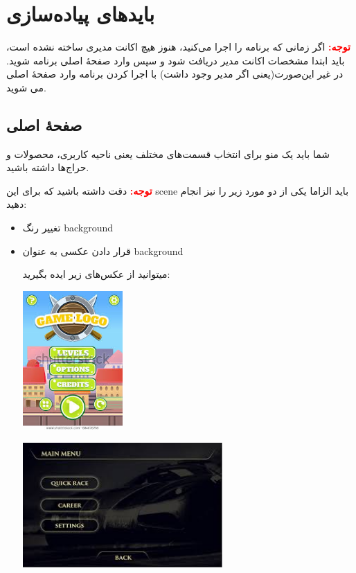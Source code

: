 \documentclass[]{article}
\begin{document}
\newpage

\section*{{\titr باید‌های پیاده‌سازی}}

\textbf{\textcolor{red}{توجه:}}
اگر زمانی که برنامه را اجرا می‌کنید، هنوز هیچ اکانت مدیری ساخته نشده است، باید ابتدا مشخصات اکانت مدیر دریافت شود و سپس وارد صفحهٔ اصلی برنامه شوید. در غیر این‌صورت(یعنی اگر مدیر وجود داشت) با اجرا کردن برنامه وارد صفحهٔ اصلی می شوید.

\subsection*{{\titr صفحهٔ اصلی}}


شما باید یک منو برای انتخاب قسمت‌های مختلف یعنی ناحیه کاربری، محصولات و حراج‌ها داشته باشید.

\textbf{\textcolor{red}{توجه:}}
 دقت داشته باشید که برای این scene باید الزاما یکی از دو مورد زیر را نیز انجام دهید:

\begin{itemize}
\item
تغییر رنگ background

\item
قرار دادن عکسی به عنوان background

میتوانید از عکس‌های زیر ایده بگیرید:

\begin{center}
\includegraphics[width=0.3\textwidth]{images/image6.png}
\end{center}

\begin{center}
\includegraphics[width=0.6\textwidth]{images/image7.png}
\end{center}
\end{itemize}
\end{document}
